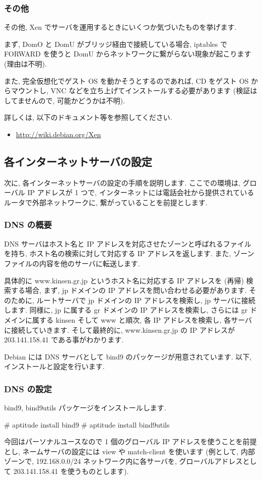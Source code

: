 \documentclass[mingoth,a4paper]{jsarticle}
\begin{document}
\subsubsection{その他}
その他, Xen でサーバを運用するときにいくつか気づいたものを挙げます.

まず, DomO と DomU がブリッジ経由で接続している場合, iptables で FORWARD を使うと DomU からネットワークに繋がらない現象が起こります (理由は不明).

また, 完全仮想化でゲスト OS を動かそうとするのであれば, CD をゲスト OS からマウントし, VNC などを立ち上げてインストールする必要があります (検証はしてませんので, 可能かどうかは不明).

詳しくは, 以下のドキュメント等を参照してください.
\begin{itemize}
\item \url{http://wiki.debian.org/Xen}
\end{itemize}

\subsection{各インターネットサーバの設定}
次に, 各インターネットサーバの設定の手順を説明します. ここでの環境は, グローバル IP アドレスが 1 つで, インターネットには電話会社から提供されているルータで外部ネットワークに, 繋がっていることを前提とします.

\subsubsection{DNS の概要}
DNS サーバはホスト名と IP アドレスを対応させたゾーンと呼ばれるファイルを持ち, ホスト名の検索に対して対応する IP アドレスを返します. また, ゾーンファイルの内容を他のサーバに転送します.

具体的に www.kinsen.gr.jp というホスト名に対応する IP アドレスを (再帰) 検索する場合, まず, jp ドメインの IP アドレスを問い合わせる必要があります. そのために, ルートサーバで jp ドメインの IP アドレスを検索し, jp サーバに接続します. 同様に, jp に属する gr ドメインの IP アドレスを検索し, さらには gr ドメインに属する kinsen そして www と順次, 各 IP アドレスを検索し, 各サーバに接続していきます. そして最終的に, www.kinsen.gr.jp の IP アドレスが 203.141.158.41 である事がわかります.

Debian には DNS サーバとして bind9 のパッケージが用意されています. 以下, インストールと設定を行います.

\subsubsection{DNS の設定}
bind9, bind9utils パッケージをインストールします.
\begin{commandline}
# aptitude install bind9
# aptitude install bind9utils
\end{commandline}
今回はパーソナルユースなので 1 個のグローバル IP アドレスを使うことを前提とし, ネームサーバの設定には view や match-client を使います (例として, 内部ゾーンで, 192.168.0.0/24 ネットワーク内に各サーバを, グローバルアドレスとして 203.141.158.41 を使うものとします).
\end{document}
